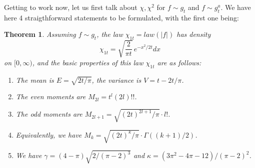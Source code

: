 \documentclass[12pt]{amsbook}
\newtheorem{theorem}{Theorem}[chapter]
\begin{document}
\bigskip

Getting to work now, let us first talk about $\chi,\chi^2$ for $f\sim g_t$ and $f\sim g_t^a$. We have here 4 straigthforward statements to be formulated, with the first one being:

\begin{theorem}
Assuming $f\sim g_t$, the law $\chi_{1t}=law(|f|)$ has density
$$\chi_{1t}=\sqrt{\frac{2}{\pi t}}\,e^{-x^2/2t}dx$$
on $[0,\infty)$, and the basic properties of this law $\chi_{1t}$ are as follows:
\begin{enumerate}
\item The mean is $E=\sqrt{2t/\pi}$, the variance is $V=t-2t/\pi$.

\item The even moments are $M_{2l}=t^l(2l)!!$.

\item The odd moments are $M_{2l+1}=\sqrt{(2t)^{2l+1}/\pi}\cdot l!$.

\item Equivalently, we have $M_k=\sqrt{(2t)^k/\pi}\cdot\Gamma((k+1)/2)$.

\item We have $\gamma=(4-\pi)\sqrt{2/(\pi-2)^3}$ and $\kappa=(3\pi^2-4\pi-12)/(\pi-2)^2$.
\end{enumerate}
\end{theorem}
\end{document}
